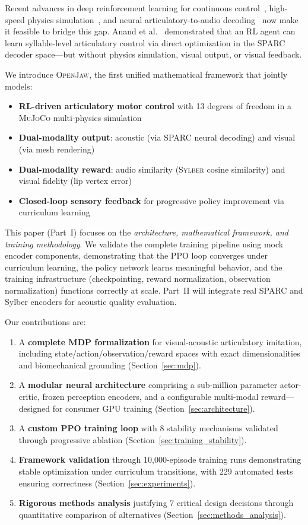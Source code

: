 \documentclass[11pt, a4paper]{article}
\newcommand{\openjaw}{\textsc{OpenJaw}}
\newcommand{\sparc}{\textsc{SPARC}}
\newcommand{\sylber}{\textsc{Sylber}}
\newcommand{\mujoco}{\textsc{MuJoCo}}
\begin{document}
Recent advances in deep reinforcement learning for continuous control~\cite{schulman2017ppo, haarnoja2018sac}, high-speed physics simulation~\cite{todorov2012mujoco}, and neural articulatory-to-audio decoding~\cite{parrot2024sparc} now make it feasible to bridge this gap. Anand et al.~\cite{anand2025articulatory} demonstrated that an RL agent can learn syllable-level articulatory control via direct optimization in the \sparc{} decoder space---but without physics simulation, visual output, or visual feedback.

We introduce \openjaw{}, the first unified mathematical framework that jointly models:
\begin{itemize}
    \item \textbf{RL-driven articulatory motor control} with 13 degrees of freedom in a \mujoco{} multi-physics simulation
    \item \textbf{Dual-modality output}: acoustic (via \sparc{} neural decoding) and visual (via mesh rendering)
    \item \textbf{Dual-modality reward}: audio similarity (\sylber{} cosine similarity) and visual fidelity (lip vertex error)
    \item \textbf{Closed-loop sensory feedback} for progressive policy improvement via curriculum learning
\end{itemize}

This paper (Part~I) focuses on the \emph{architecture, mathematical framework, and training methodology}. We validate the complete training pipeline using mock encoder components, demonstrating that the PPO loop converges under curriculum learning, the policy network learns meaningful behavior, and the training infrastructure (checkpointing, reward normalization, observation normalization) functions correctly at scale. Part~II will integrate real SPARC and Sylber encoders for acoustic quality evaluation.

Our contributions are:
\begin{enumerate}
    \item A \textbf{complete MDP formalization} for visual-acoustic articulatory imitation, including state/action/observation/reward spaces with exact dimensionalities and biomechanical grounding (Section~\ref{sec:mdp}).
    \item A \textbf{modular neural architecture} comprising a sub-million parameter actor-critic, frozen perception encoders, and a configurable multi-modal reward---designed for consumer GPU training (Section~\ref{sec:architecture}).
    \item A \textbf{custom PPO training loop} with 8 stability mechanisms validated through progressive ablation (Section~\ref{sec:training_stability}).
    \item \textbf{Framework validation} through 10,000-episode training runs demonstrating stable optimization under curriculum transitions, with 229 automated tests ensuring correctness (Section~\ref{sec:experiments}).
    \item \textbf{Rigorous methods analysis} justifying 7 critical design decisions through quantitative comparison of alternatives (Section~\ref{sec:methods_analysis}).
\end{enumerate}
\end{document}
